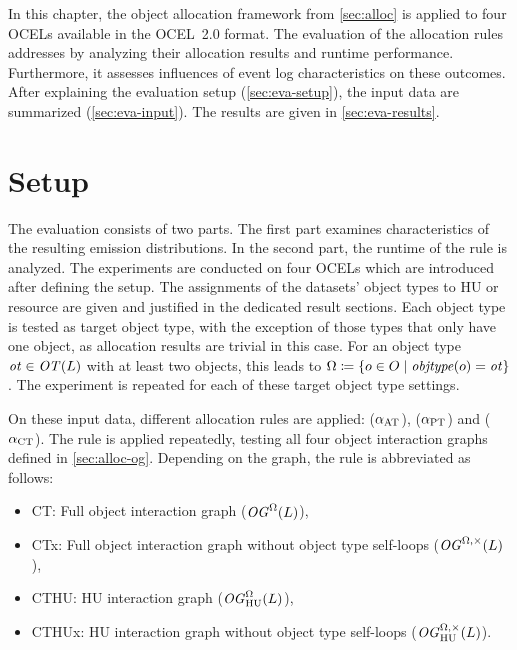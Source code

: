 In this chapter, the object allocation framework from \autoref{sec:alloc} is applied to four OCELs available in the OCEL~2.0 format.
The evaluation of the allocation rules addresses \RGfourB{} by analyzing their allocation results and runtime performance. Furthermore, it assesses influences of event log characteristics on these outcomes.
%
After explaining the evaluation setup (\autoref{sec:eva-setup}), the input data are summarized (\autoref{sec:eva-input}). The results are given in \autoref{sec:eva-results}.

\section{Setup}
\label{sec:eva-setup}

The evaluation consists of two parts.
The first part examines characteristics of the resulting emission distributions. In the second part, the runtime of the  rule is analyzed.
The experiments are conducted on four OCELs which are introduced after defining the setup.
%
The assignments of the datasets' object types to HU or resource are given and justified in the dedicated result sections.
Each object type is tested as target object type, with the exception of those types that only have one object, as allocation results are trivial in this case. For an object type $\mathit{ot}\in\mathit{OT}(L)$ with at least two objects, this leads to
$\Omega\coloneqq \{ o\in O \mid \mathit{objtype}(o)=\mathit{ot} \}$.
The experiment is repeated for each of these target object type settings.

On these input data, different allocation rules are applied:
 ($\alpha_\text{AT}$),
 ($\alpha_\text{PT}$)
and  ($\alpha_\text{CT}$).
%
The  rule is applied repeatedly, testing all four object interaction graphs defined in \autoref{sec:alloc-og}.
Depending on the graph, the rule is abbreviated as follows:
\begin{itemize}
  \item CT: Full object interaction graph ($\mathit{OG}^\Omega(L)$),
  \item CTx: Full object interaction graph without object type self-loops ($\mathit{OG}^{\Omega,\times}(L)$),
  \item CTHU: HU interaction graph ($\mathit{OG}_{\text{HU}}^\Omega(L)$),
  \item CTHUx: HU interaction graph without object type self-loops ($\mathit{OG}_{\text{HU}}^{\Omega,\times}(L)$).
\end{itemize}

